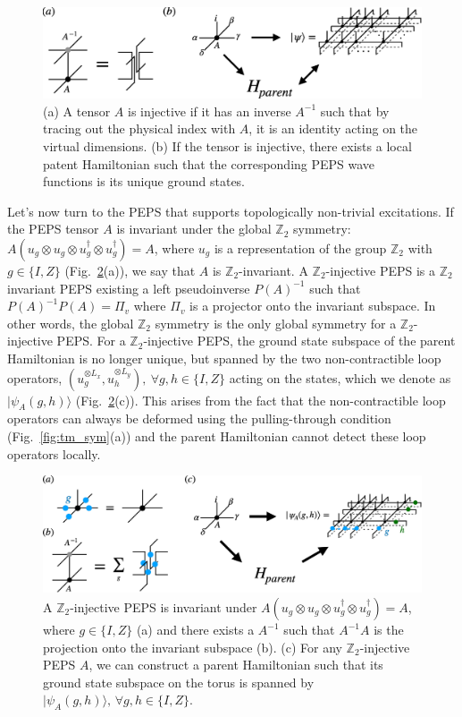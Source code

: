 \documentclass{ntuthesis}
\begin{document}
\begin{figure}[t]
\centering
\includegraphics[width=\linewidth]{injectivePEPS}
\caption{(a) A tensor $A$ is injective if it has an inverse $A^{-1}$ such that by tracing out the physical index with $A$, it is an identity acting on the virtual dimensions. (b) If the tensor is injective, there exists a local patent Hamiltonian such that the corresponding PEPS wave functions is its unique ground states.}
\label{fig:injectivePEPS}
\end{figure}

Let's now turn to the PEPS that supports topologically non-trivial excitations.
If the PEPS tensor $A$ is invariant under the global $\mathbb{Z}_2$ symmetry: $A(u_g \otimes u_g \otimes u_g^\dagger \otimes u_g^\dagger) = A $, where $u_g$ is a representation of the group $\mathbb{Z}_2 $ with $g \in \{I, Z\}$ (Fig.~\ref{fig:Z2injectivePEPS}(a)), we say that $A$ is $\mathbb{Z}_2$-invariant.
%
A $\mathbb{Z}_2$-injective PEPS is a $\mathbb{Z}_2$ invariant PEPS existing a left pseudoinverse $P(A)^{-1}$ such that $P(A)^{-1} P(A) = \Pi_v$ where $\Pi_v$ is a projector onto the invariant subspace.
%
In other words, the global $\mathbb{Z}_2$ symmetry is the only global symmetry for a $\mathbb{Z}_2 $-injective PEPS.
%
For a $\mathbb{Z}_2$-injective PEPS, the ground state subspace of the parent Hamiltonian is no longer unique, but spanned by the two non-contractible loop operators, $(u_g^{\otimes L_x}, u_h^{\otimes L_y} ),\  \forall g,h \in \{{I}, Z\}$ acting on the states, which we denote as $|\psi_A(g,h)\rangle$ (Fig.~\ref{fig:Z2injectivePEPS}(c)). 
%
This arises from the fact that the non-contractible loop operators can always be deformed using the pulling-through condition (Fig.~\ref{fig:tm_sym}(a)) and the parent Hamiltonian cannot detect these loop operators locally. 
%


\begin{figure}[t]
\centering
\includegraphics[width=\linewidth]{Z2injectivePEPS}
\caption{A $\mathbb{Z}_2$-injective PEPS is invariant under $A(u_g \otimes u_g \otimes u_g^\dagger \otimes u_g^\dagger) = A $, where $g \in \{{I}, {Z}\}$ (a) and there exists a $A^{-1}$ such that $A^{-1}A$ is the projection onto the invariant subspace (b). (c) For any $\mathbb{Z}_2$-injective PEPS $A$, we can construct a parent Hamiltonian such that its ground state subspace on the torus is spanned by $|\psi_A(g,h)\rangle, \,  \forall g,h \in \{{I}, Z\}$. }
\label{fig:Z2injectivePEPS}
\end{figure}
\end{document}
